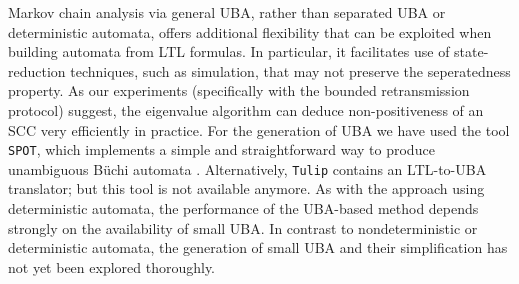 \documentclass{elsarticle}
\newcommand{\spot}{\texttt{SPOT}}
\begin{document}
Markov chain analysis via general UBA, rather than separated UBA or
deterministic automata, offers additional flexibility that can be
exploited when building automata from LTL formulas.  In particular, it
facilitates use of state-reduction techniques, such as simulation,
that may not preserve the seperatedness property.  As our experiments
(specifically with the bounded retransmission protocol) suggest, the
eigenvalue algorithm can deduce non-positiveness of an SCC very
efficiently in practice.  For the generation of UBA we have used the
tool \spot, which implements a simple and straightforward way to
produce unambiguous B\"uchi automata \cite{DuretHabil17}.
Alternatively, \texttt{Tulip} contains an LTL-to-UBA translator; but
this tool is not available anymore.  As with the approach using
deterministic automata, the performance of the UBA-based method
depends strongly on the availability of small UBA. In contrast to
nondeterministic or deterministic automata, the generation of small
UBA and their simplification has not yet been explored thoroughly.



\end{document}
